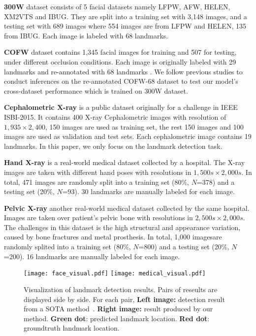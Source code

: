 \documentclass[runningheads]{llncs}
\begin{document}
\noindent\textbf{300W} \cite{sagonas2013300} dataset consists of 5 facial datasets namely LFPW, AFW, HELEN, XM2VTS and IBUG. They are split into a training set with 3,148 images, and a testing set with 689 images where 554 images are from LFPW and HELEN, 135 from IBUG. Each image is labeled with 68 landmarks.

\noindent\textbf{COFW} \cite{burgos2013robust} dataset contains 1,345 facial images for training and 507 for testing, under different occlusion conditions. Each image is originally labeled with 29 landmarks and re-annotated with 68 landmarks \cite{ghiasi2015occlusion}. We follow previous studies \cite{wu2018look,qian2019aggregation} to conduct inferences on the re-annotated COFW-68 dataset to test our model's cross-dataset performance which is trained on 300W dataset.

\noindent\textbf{Cephalometric X-ray} \cite{wang2016benchmark} is a public dataset originally for a challenge in IEEE ISBI-2015. It contains 400 X-ray Cephalometric images with resolution of $1,935 \times 2,400$, 150 images are used as training set, the rest 150 images and 100 images are used as validation and test sets. Each cephalometric image contains 19 landmarks. In this paper, we only focus on the landmark detection task.

\noindent\textbf{Hand X-ray} \cite{lu2020learning} is a real-world medical dataset collected by a hospital. The X-ray images are taken with different hand poses with resolutions in $1,500s \times 2,000s$. In total, 471 images are randomly split into a training set (80\%, $N$=378) and a testing set (20\%, $N$=93). 30 landmarks are manually labeled for each image.

\noindent\textbf{Pelvic X-ray} \cite{wang2019weakly,chen2020anatomy} another real-world medical dataset collected by the same hospital. Images are taken over patient's pelvic bone with resolutions in $2,500s \times 2,000s$. The challenges in this dataset is the high structural and appearance variation, caused by bone fractures and metal prosthesis. In total, 1,000 imagesare randomly splited into a training set (80\%, $N$=800) and a testing set (20\%, $N$=200). 16 landmarks are manually labeled for each image. 

\begin{figure*}[t]
	\centering
	\texttt{[image: face\_visual.pdf]}
	\texttt{[image: medical\_visual.pdf]}
	\caption{Visualization of landmark detection results. Pairs of reseults are displayed side by side. 
	For each pair, \textbf{Left image:} detection result from a SOTA method~\cite{sun2019deep}. \textbf{Right image:} result produced by our method. \textbf{Green dot}: predicted landmark location. \textbf{Red dot}: groundtruth landmark location.
	}
	\label{fig:face_visual}
\end{figure*}
\end{document}
